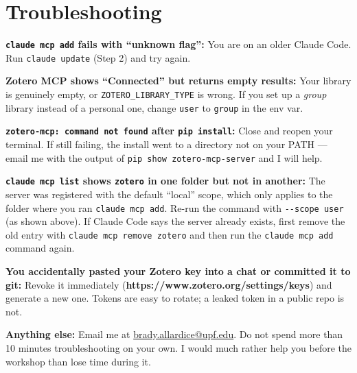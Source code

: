 \documentclass[11pt]{article}
\begin{document}
\section*{Troubleshooting}

\textbf{\texttt{claude mcp add} fails with ``unknown flag'':} You are on an older Claude Code. Run \texttt{claude update} (Step 2) and try again.

\textbf{Zotero MCP shows ``Connected'' but returns empty results:} Your library is genuinely empty, or \texttt{ZOTERO\_LIBRARY\_TYPE} is wrong. If you set up a \emph{group} library instead of a personal one, change \texttt{user} to \texttt{group} in the env var.

\textbf{\texttt{zotero-mcp: command not found} after \texttt{pip install}:} Close and reopen your terminal. If still failing, the install went to a directory not on your PATH --- email me with the output of \texttt{pip show zotero-mcp-server} and I will help.

\textbf{\texttt{claude mcp list} shows \texttt{zotero} in one folder but not in another:} The server was registered with the default ``local'' scope, which only applies to the folder where you ran \texttt{claude mcp add}. Re-run the command with \texttt{-\/-scope user} (as shown above). If Claude Code says the server already exists, first remove the old entry with \texttt{claude mcp remove zotero} and then run the \texttt{claude mcp add} command again.

\textbf{You accidentally pasted your Zotero key into a chat or committed it to git:} Revoke it immediately (\textbf{https://www.zotero.org/settings/keys}) and generate a new one. Tokens are easy to rotate; a leaked token in a public repo is not.

\textbf{Anything else:} Email me at \href{mailto:brady.allardice@upf.edu}{brady.allardice@upf.edu}. Do not spend more than 10 minutes troubleshooting on your own. I would much rather help you before the workshop than lose time during it.
\end{document}
